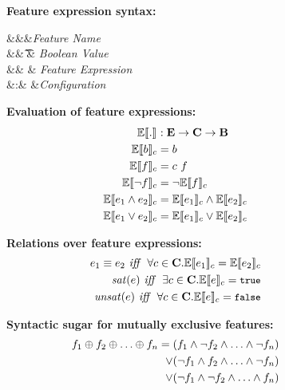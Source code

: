 \begin{figure}
%
\textbf{Feature expression syntax:}
\begin{syntax}
\synDef \fName \fSet &&&\textit{Feature Name}\\
\synDef \bTag \bSet &\eqq& \t \myOR \f & \textit{Boolean Value}\\
\synDef \dimMeta \ffSet &\eqq& \bTag \myOR \fName \myOR \neg \dimMeta \myOR \dimMeta \wedge \dimMeta \myOR \dimMeta \vee \dimMeta & \textit{Feature Expression}\\
\synDef \config \confSet &:& \fSet \to \bSet &\textit{Configuration}
\end{syntax}

\medskip
\textbf{Evaluation of feature expressions:}
\begin{alignat*}{1}
\fSem [] . &: \ffSet \to \confSet \to \bSet\\
\fSem \bTag &= \bTag\\
\fSem \fName &= \config \ \fName\\
\fSem {\neg \fName} &= \neg \fSem \fName\\
\fSem {\annd \dimMeta} &= \fSem {\dimMeta_1} \wedge \fSem {\dimMeta_2}\\
\fSem {\orr \dimMeta} &= \fSem {\dimMeta_1} \vee \fSem {\dimMeta_2}\\
\end{alignat*}

\medskip
\textbf{Relations over feature expressions:}
\begin{alignat*}{1}
\dimMeta_1 \equiv \dimMeta_2 \textit{ iff \ } \forall \config \in \confSet. \fSem {\dimMeta_1} = \fSem {\dimMeta_2}\\
\sat {\dimMeta} \textit{ iff \ } \exists \config \in \confSet. \fSem {\dimMeta} = \t\\
\unsat {\dimMeta} \textit{ iff \ } \forall \config \in \confSet. \fSem {\dimMeta} = \f
\end{alignat*}

\medskip
\textbf{Syntactic sugar for mutually exclusive features:}
\begin{alignat*}{1}
\A \oplus \B \oplus \ldots \oplus \fName_n
= (\A \wedge \neg \B \wedge \ldots \wedge \neg \fName_n)\\
\vee (\neg \A \wedge \B \wedge \ldots \wedge \neg \fName_n)\\
\vee (\neg \A \wedge \neg \B \wedge \ldots \wedge \fName_n)
\end{alignat*}



\end{figure}
